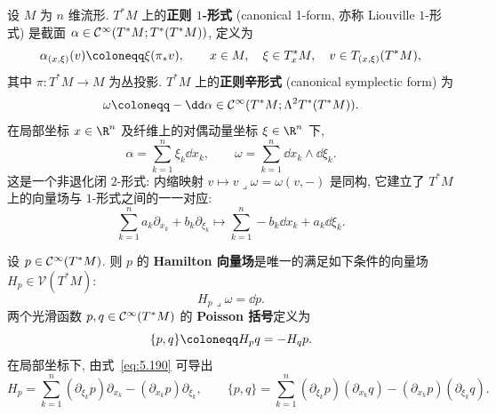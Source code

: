 \begin{definition}\label{def:5.80}
设 $M$ 为 $n$ 维流形. $T^* M$ 上的\textbf{正则 $1$-形式} (canonical 1-form, 亦称 Liouville $1$-形式) 是截面 $\alpha \in \mathcal{C}^\infty(T^* M; T^*(T^* M))$, 定义为
\begin{equation}\label{eq:5.187}
    \alpha_{(x, \xi)}(v) \defeq \xi(\pi_* v), \qquad x \in M, \quad \xi \in T_x^* M, \quad v \in T_{(x, \xi)}(T^* M),
\end{equation}
其中 $\pi \colon T^* M \to M$ 为丛投影. $T^* M$ 上的\textbf{正则辛形式} (canonical symplectic form) 为
\begin{equation}\label{eq:5.188}
    \omega \defeq -\dd\alpha \in \Smooth(T^* M; \Lambda^2 T^*(T^* M)).
\end{equation}
在局部坐标 $x \in \R^n$ 及纤维上的对偶动量坐标 $\xi \in \R^n$ 下,
\begin{equation}\label{eq:5.189}
    \alpha = \sum_{k=1}^n \xi_k \dd x_k, \qquad \omega = \sum_{k=1}^n \dd x_k \wedge \dd\xi_k.
\end{equation}
这是一个非退化闭 $2$-形式: 内缩映射 $v \mapsto v \mathbin{\lrcorner} \omega = \omega(v, -)$ 是同构, 它建立了 $T^* M$ 上的向量场与 $1$-形式之间的一一对应:
\begin{equation}\label{eq:5.190}
    \sum_{k=1}^n a_k \partial_{x_k} + b_k \partial_{\xi_k} \mapsto \sum_{k=1}^n -b_k \dd x_k + a_k \dd\xi_k.
\end{equation}
\end{definition}

\begin{definition}\label{def:5.81}
设 $p \in \mathcal{C}^\infty(T^* M)$. 则 $p$ 的 \textbf{Hamilton 向量场}是唯一的满足如下条件的向量场 $H_p \in \mathcal{V}(T^* M)$:
\begin{equation}\label{eq:5.191}
    H_p \mathbin{\lrcorner} \omega = \dd p.
\end{equation}
两个光滑函数 $p, q \in \mathcal{C}^\infty(T^* M)$ 的 \textbf{Poisson 括号}定义为
\begin{equation}\label{eq:5.192}
    \{p, q\} \defeq H_p q = -H_q p.
\end{equation}
在局部坐标下, 由式~\eqref{eq:5.190} 可导出
\begin{equation}\label{eq:5.193}
    H_p = \sum_{k=1}^n (\partial_{\xi_k} p) \partial_{x_k} - (\partial_{x_k} p) \partial_{\xi_k}, \qquad \{p, q\} = \sum_{k=1}^n (\partial_{\xi_k} p)(\partial_{x_k} q) - (\partial_{x_k} p)(\partial_{\xi_k} q).
\end{equation}
\end{definition}

